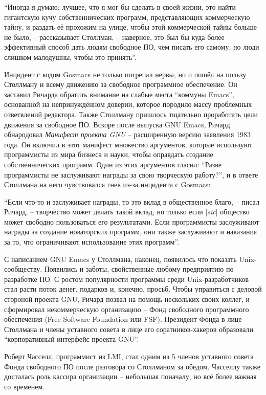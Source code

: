 \enquote{Иногда я думаю: лучшее, что я мог бы сделать в своей жизни, это найти гигантскую кучу собственнических программ, представляющих коммерческую тайну, и раздать её прохожим на улице, чтобы этой коммерческой тайны больше не было, -- рассказывает Столлман, -- наверное, это был бы куда более эффективный способ дать людям свободное ПО, чем писать его самому, но люди слишком малодушны, чтобы это принять}.

Инцидент с кодом Gosmacs не только потрепал нервы, но и пошёл на пользу Столлману и всему движению за свободное программное обеспечение. Он заставил Ричарда обратить внимание на слабые места \enquote{коммуны Emacs}, основанной на непринуждённом доверии, которое породило массу проблемных ответвлений редактора. Также Столлману пришлось тщательно проработать цели движения за свободное ПО. Вскоре после выпуска GNU Emacs, Ричард обнародовал \textit{Манифест проекта GNU} -- расширенную версию заявления 1983 года. Он включил в этот манифест множество аргументов, которые используют программисты из мира бизнеса и науки, чтобы оправдать создание собственнических программ. Один из этих аргументов гласил: \enquote{Разве программисты не заслуживают награды за свою творческую работу?}, и в ответе Столлмана на него чувствовался гнев из-за инцидента с Gosmacs:

\enquote{Если что-то и заслуживает награды, то это вклад в общественное благо, -- писал Ричард, -- творчество может делать такой вклад, но только если [\textit{sic}] общество может свободно пользоваться его результатами. Если программисты заслуживают награды за создание новаторских программ, они также заслуживают и наказания за то, что ограничивают использование этих программ}.

С написанием GNU Emacs у Столлмана, наконец, появилось что показать Unix-сообществу. Появились и заботы, свойственные любому предприятию по разработке ПО. С ростом популярности программы среди Unix-разработчиков стал расти поток денег, подарков и, конечно, просьб. Чтобы управиться с деловой стороной проекта GNU, Ричард позвал на помощь нескольких своих коллег, и сформировал некоммерческую организацию -- Фонд свободного программного обеспечения (Free Software Foundation или FSF). Президент Фонда в лице Столлмана и члены уставного совета в лице его соратников-хакеров образовали \enquote{корпоративный интерфейс проекта GNU}.

Роберт Часселл, программист из LMI, стал одним из 5 членов уставного совета Фонда свободного ПО после разговора со Столлманом за обедом. Часселлу также досталась роль кассира организации -- небольшая поначалу, но всё более важная со временем.

